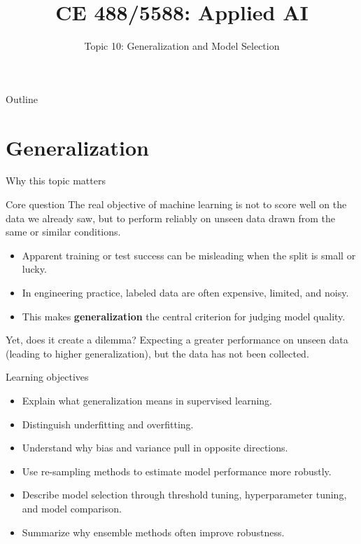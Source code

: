 \documentclass[12pt]{beamer}
\title{CE 488/5588: Applied AI}
\subtitle{Topic 10: Generalization and Model Selection}
\author{}
\date{}
\begin{document}
\begin{frame}
  \titlepage
\end{frame}

\begin{frame}{Outline}
  \tableofcontents
\end{frame}

\section{Generalization}

\begin{frame}{Why this topic matters}
  \begin{conceptbox}{Core question}
    The real objective of machine learning is not to score well on the data we already saw,
    but to perform reliably on unseen data drawn from the same or similar conditions.
  \end{conceptbox}
  \begin{itemize}
    \item Apparent training or test success can be misleading when the split is small or lucky.
    \item In engineering practice, labeled data are often expensive, limited, and noisy.
    \item This makes \textbf{generalization} the central criterion for judging model quality.
  \end{itemize}
  \begin{warningbox}{ Yet, does it create a dilemma? }
 Expecting a greater performance on unseen data (leading to higher generalization), but the data has not been collected.
  \end{warningbox}
\end{frame}

\begin{frame}{Learning objectives}
  \begin{itemize}
    \item Explain what generalization means in supervised learning.
    \item Distinguish underfitting and overfitting.
    \item Understand why bias and variance pull in opposite directions.
    \item Use re-sampling methods to estimate model performance more robustly.
    \item Describe model selection through threshold tuning, hyperparameter tuning, and model comparison.
    \item Summarize why ensemble methods often improve robustness.
  \end{itemize}
\end{frame}
\end{document}
